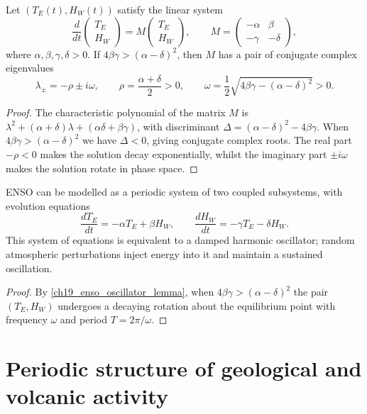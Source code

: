 \begin{lemma}\label{ch19_enso_oscillator_lemma}
Let $(T_E(t),H_W(t))$ satisfy the linear system
\[
\frac{d}{dt}\begin{pmatrix}T_E\\H_W\end{pmatrix}
= M\begin{pmatrix}T_E\\H_W\end{pmatrix},\qquad
M=\begin{pmatrix}-\alpha & \beta\\ -\gamma & -\delta\end{pmatrix},
\]
where $\alpha,\beta,\gamma,\delta>0$. If $4\beta\gamma>(\alpha-\delta)^2$, then $M$ has a pair of conjugate complex eigenvalues
\[
\lambda_{\pm}=-\rho\pm i\omega,\qquad
\rho=\frac{\alpha+\delta}{2}>0,\qquad
\omega=\frac{1}{2}\sqrt{4\beta\gamma-(\alpha-\delta)^2}>0.
\]
\end{lemma}

\begin{proof}
The characteristic polynomial of the matrix $M$ is $\lambda^2+(\alpha+\delta)\lambda+(\alpha\delta+\beta\gamma)$, with discriminant $\Delta=(\alpha-\delta)^2-4\beta\gamma$. When $4\beta\gamma>(\alpha-\delta)^2$ we have $\Delta<0$, giving conjugate complex roots. The real part $-\rho<0$ makes the solution decay exponentially, whilst the imaginary part $\pm i\omega$ makes the solution rotate in phase space.
\end{proof}

\begin{proposition}\label{prop:enso_periodic_system}
ENSO can be modelled as a periodic system of two coupled subsystems, with evolution equations
\[
\frac{dT_E}{dt}=-\alpha T_E+\beta H_W,\qquad
\frac{dH_W}{dt}=-\gamma T_E-\delta H_W.
\]
This system of equations is equivalent to a damped harmonic oscillator; random atmospheric perturbations inject energy into it and maintain a sustained oscillation.
\end{proposition}

\begin{proof}
By \cref{ch19_enso_oscillator_lemma}, when $4\beta\gamma>(\alpha-\delta)^2$ the pair $(T_E,H_W)$ undergoes a decaying rotation about the equilibrium point with frequency $\omega$ and period $T=2\pi/\omega$.
\end{proof}

\section{Periodic structure of geological and volcanic activity}
\label{sec:geological_cycles}

